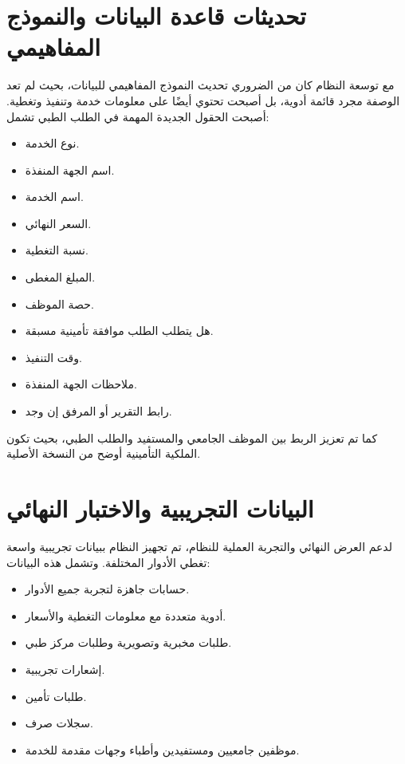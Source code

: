 \documentclass[12pt,a4paper]{report}
\begin{document}
\chapter{تحديثات قاعدة البيانات والنموذج المفاهيمي}

مع توسعة النظام كان من الضروري تحديث النموذج المفاهيمي للبيانات، بحيث لم تعد الوصفة مجرد قائمة أدوية، بل أصبحت تحتوي أيضًا على معلومات خدمة وتنفيذ وتغطية. أصبحت الحقول الجديدة المهمة في الطلب الطبي تشمل:

\begin{itemize}[itemsep=4pt]
  \item نوع الخدمة.
  \item اسم الجهة المنفذة.
  \item اسم الخدمة.
  \item السعر النهائي.
  \item نسبة التغطية.
  \item المبلغ المغطى.
  \item حصة الموظف.
  \item هل يتطلب الطلب موافقة تأمينية مسبقة.
  \item وقت التنفيذ.
  \item ملاحظات الجهة المنفذة.
  \item رابط التقرير أو المرفق إن وجد.
\end{itemize}

كما تم تعزيز الربط بين الموظف الجامعي والمستفيد والطلب الطبي، بحيث تكون الملكية التأمينية أوضح من النسخة الأصلية.

\chapter{البيانات التجريبية والاختبار النهائي}

لدعم العرض النهائي والتجربة العملية للنظام، تم تجهيز النظام ببيانات تجريبية واسعة تغطي الأدوار المختلفة. وتشمل هذه البيانات:

\begin{itemize}[itemsep=4pt]
  \item حسابات جاهزة لتجربة جميع الأدوار.
  \item أدوية متعددة مع معلومات التغطية والأسعار.
  \item طلبات مخبرية وتصويرية وطلبات مركز طبي.
  \item إشعارات تجريبية.
  \item طلبات تأمين.
  \item سجلات صرف.
  \item موظفين جامعيين ومستفيدين وأطباء وجهات مقدمة للخدمة.
\end{itemize}
\end{document}
